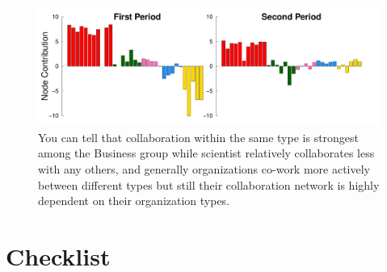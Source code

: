 \documentclass[12pt]{article}
\begin{document}
\begin{figure}[h]
	\centering
	\includegraphics[width=\linewidth]{../Figure/barplots_nolegend.pdf}	
	\caption{You can tell that collaboration within the same type is strongest among the Business group while scientist relatively collaborates less with any others, and generally organizations co-work more actively between different types but still their collaboration network is highly dependent on their organization types.}
	\label{fig:barplots}
\end{figure}
\newpage
\section{Checklist}
\end{document}
